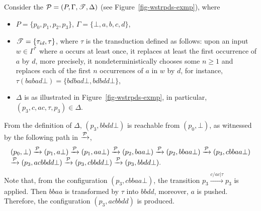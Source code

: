 \begin{example}\label{exmp-wpotrpds}
Consider the {\WOTrPDS} ${\mathcal{P} }=(P, \Gamma, {\mathscr{T} }, \Delta)$ (see Figure~\ref{fig-wstrpds-exmp}), where 
\begin{itemize}
\item $P = \{p_0, p_1, p_2, p_3\}$,  $\Gamma = \{\bot, a, b, c, d\}$,
% 
\item ${\mathscr{T} } = \{\tau_{id}, \tau\}$, where $\tau$ is the transduction defined as follows: upon an input $w \in \Gamma^*$ where $a$ occurs at least once, it replaces at least the first occurrence of $a$ by $d$, more precisely, it nondeterministically chooses some $n \ge 1$ and replaces each of the first $n$ occurrences of $a$ in $w$ by $d$, for instance, $\tau(babad\bot) = \{bdbad\bot, bdbdd\bot\}$,
%
\item $\Delta$ is as illustrated in Figure~\ref{fig-wstrpds-exmp}, in particular, $(p_3, c, ac, \tau, p_3) \in \Delta$. 
\end{itemize}

From the definition of $\Delta$, $(p_3, bbdd\bot)$ is reachable from $(p_0, \bot)$, as witnessed by the following path in $\xrightarrow{{\mathcal{P} }}$, 
\[
\begin{array}{l}
(p_0, \bot) \xrightarrow{{\mathcal{P} }} (p_1, a \bot) \xrightarrow{{\mathcal{P} }} (p_1, aa \bot) \xrightarrow{{\mathcal{P} }} (p_2, baa \bot)  \xrightarrow{{\mathcal{P} }} (p_2, bbaa \bot)  \xrightarrow{{\mathcal{P} }} (p_3, cbbaa \bot)  \\
\xrightarrow{{\mathcal{P} }} (p_3, acbbdd \bot) \xrightarrow{{\mathcal{P} }} (p_3, cbbdd \bot)  \xrightarrow{{\mathcal{P} }} (p_3, bbdd \bot). 
\end{array}
\]
Note that, from the configuration $(p_3, cbbaa \bot)$, the transition $p_3 \xrightarrow{c/ac|\tau } p_3$ is applied. Then  $bbaa$ is transformed by $\tau$ into $bbdd$, moreover, $a$ is pushed. Therefore, the configuration $(p_3, acbbdd)$ is produced.


\end{example}
